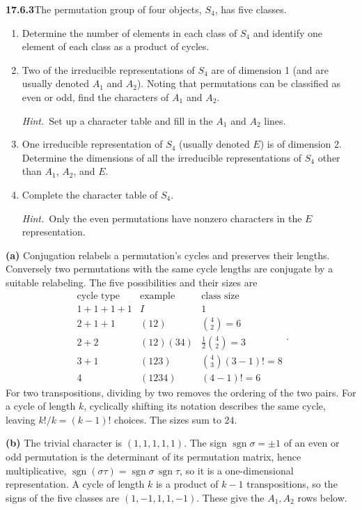 \par\bigskip
\noindent\textbf{17.6.3}\quad The permutation group of four objects,
$S_{4}$, has five classes.
\begin{enumerate}
\item[(a)] Determine the number of elements in each class of $S_{4}$
and identify one element of each class as a product of cycles.
\item[(b)] Two of the irreducible representations of $S_{4}$ are of
dimension 1 (and are usually denoted $A_{1}$ and $A_{2}$). Noting
that permutations can be classified as even or odd, find the
characters of $A_{1}$ and $A_{2}$.
\par\emph{Hint.}~Set up a character table and fill in the $A_{1}$ and
$A_{2}$ lines.
\item[(c)] One irreducible representation of $S_{4}$ (usually denoted
$E$) is of dimension 2. Determine the dimensions of all the
irreducible representations of $S_{4}$ other than $A_{1}$, $A_{2}$,
and $E$.
\item[(d)] Complete the character table of $S_{4}$.
\par\emph{Hint.}~Only the even permutations have nonzero characters
in the $E$ representation.
\end{enumerate}
\solution
\textbf{(a)} Conjugation relabels a permutation's cycles and preserves
their lengths. Conversely two permutations with the same cycle
lengths are conjugate by a suitable relabeling. The five possibilities
and their sizes are
\[
\begin{array}{c|c|c}
\text{cycle type}&\text{example}&\text{class size}\\\hline
1+1+1+1&I&1\\
2+1+1&(12)&\binom42=6\\
2+2&(12)(34)&\frac12\binom42=3\\
3+1&(123)&\binom43(3-1)!=8\\
4&(1234)&(4-1)!=6
\end{array}.
\]
For two transpositions, dividing by two removes the ordering
of the two pairs. For a cycle of length $k$, cyclically shifting
its notation describes the same cycle, leaving $k!/k=(k-1)!$
choices. The sizes sum to $24$.

\textbf{(b)} The trivial character is $(1,1,1,1,1)$.
The sign $\operatorname{sgn}\sigma=\pm1$ of an even or odd permutation
is the determinant of its permutation matrix, hence multiplicative,
$\operatorname{sgn}(\sigma\tau)=\operatorname{sgn}\sigma\,\operatorname{sgn}\tau$,
so it is a one-dimensional representation.
A cycle of length $k$ is a product of $k-1$ transpositions, so
the signs of the five classes are $(1,-1,1,1,-1)$.
These give the $A_1,A_2$ rows below.

